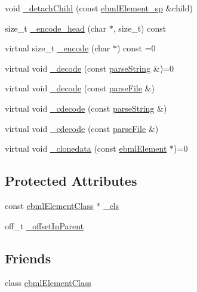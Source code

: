 \begin{DoxyCompactItemize}
\item 
void \mbox{\hyperlink{classebml_1_1ebmlElement_ae2e24c1aa8ef7bd93c1ec64573afaff1}{\+\_\+detach\+Child}} (const \mbox{\hyperlink{namespaceebml_adad533b7705a16bb360fe56380c5e7be}{ebml\+Element\+\_\+sp}} \&child)
\item 
size\+\_\+t \mbox{\hyperlink{classebml_1_1ebmlElement_a54744a82d2007dac6d8ee795786cc881}{\+\_\+encode\+\_\+head}} (char $\ast$, size\+\_\+t) const
\item 
virtual size\+\_\+t \mbox{\hyperlink{classebml_1_1ebmlElement_a27bd9de14e1706840235b68331917776}{\+\_\+encode}} (char $\ast$) const =0
\item 
virtual void \mbox{\hyperlink{classebml_1_1ebmlElement_af7852c01970bf937f6787eac4843bdbd}{\+\_\+decode}} (const \mbox{\hyperlink{classebml_1_1parseString}{parse\+String}} \&)=0
\item 
virtual void \mbox{\hyperlink{classebml_1_1ebmlElement_adf579591cece6b61d85cdb48861c3620}{\+\_\+decode}} (const \mbox{\hyperlink{classebml_1_1parseFile}{parse\+File}} \&)
\item 
virtual void \mbox{\hyperlink{classebml_1_1ebmlElement_a685441a87d36f6cfc844a72068b32c18}{\+\_\+cdecode}} (const \mbox{\hyperlink{classebml_1_1parseString}{parse\+String}} \&)
\item 
virtual void \mbox{\hyperlink{classebml_1_1ebmlElement_ab35f8705d2eec94a8af453cac0a53341}{\+\_\+cdecode}} (const \mbox{\hyperlink{classebml_1_1parseFile}{parse\+File}} \&)
\item 
virtual void \mbox{\hyperlink{classebml_1_1ebmlElement_a3ebe3aa75b62971f385c01f27c807a02}{\+\_\+clonedata}} (const \mbox{\hyperlink{classebml_1_1ebmlElement}{ebml\+Element}} $\ast$)=0
\end{DoxyCompactItemize}
\subsection*{Protected Attributes}
\begin{DoxyCompactItemize}
\item 
const \mbox{\hyperlink{classebml_1_1ebmlElementClass}{ebml\+Element\+Class}} $\ast$ \mbox{\hyperlink{classebml_1_1ebmlElement_a8599f2d1b37594d8ee97fc55e10d7c89}{\+\_\+cls}}
\item 
off\+\_\+t \mbox{\hyperlink{classebml_1_1ebmlElement_acd087ec13aeafbb0e854392273929431}{\+\_\+offset\+In\+Parent}}
\end{DoxyCompactItemize}
\subsection*{Friends}
\begin{DoxyCompactItemize}
\item 
class \mbox{\hyperlink{classebml_1_1ebmlElement_a59f545ad07cbee7ac3e53dcc0f675c78}{ebml\+Element\+Class}}
\end{DoxyCompactItemize}


